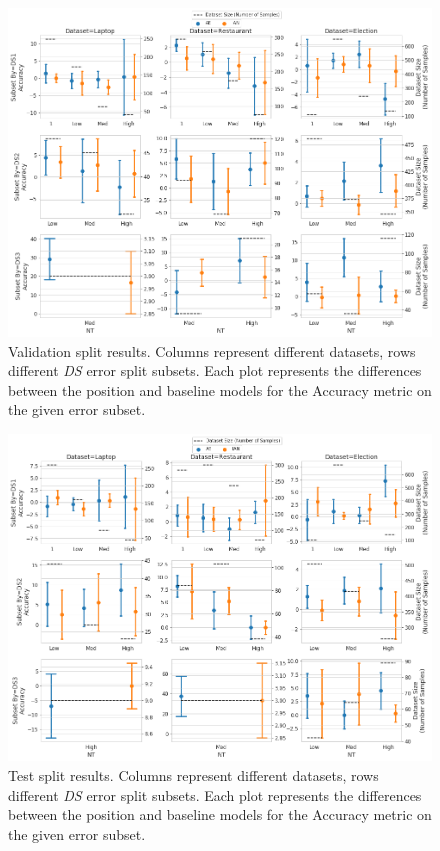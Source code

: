 \begin{figure}[h!]
    \centering
    \includegraphics[scale=0.32]{images/augmentation/methods_performance/Position_Encoding/position_DS_NT_validation.png}
    \caption{Validation split results. Columns represent different datasets, rows different \textit{DS} error split subsets. Each plot represents the differences between the position and baseline models for the Accuracy metric on the given error subset.}
    \label{fig:aug_position_DS_NT_validation}
\end{figure}

\begin{figure}[h!]
    \centering
    \includegraphics[scale=0.32]{images/augmentation/methods_performance/Position_Encoding/position_DS_NT_test.png}
    \caption{Test split results. Columns represent different datasets, rows different \textit{DS} error split subsets. Each plot represents the differences between the position and baseline models for the Accuracy metric on the given error subset.}
    \label{fig:aug_position_DS_NT_test}
\end{figure}

